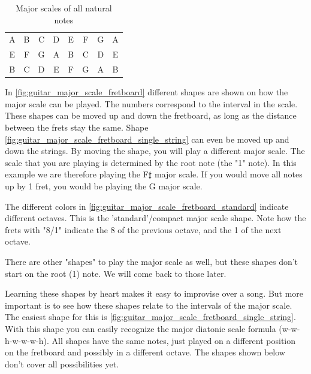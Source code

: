 \begin{table}[h]
\begin{tabular}{*{16}{c}}
		\multicolumn{2}{P{4mm}}{A} & \multicolumn{2}{P{4mm}}{B} & \multicolumn{2}{P{4mm}}{C\sharp} & \multicolumn{2}{P{4mm}}{D} & \multicolumn{2}{P{4mm}}{E} & \multicolumn{2}{P{4mm}}{F\sharp} & \multicolumn{2}{P{4mm}}{G\sharp} & \multicolumn{2}{P{4mm}}{A} \\
		\multicolumn{2}{P{4mm}}{E} & \multicolumn{2}{P{4mm}}{F\sharp} & \multicolumn{2}{P{4mm}}{G\sharp} & \multicolumn{2}{P{4mm}}{A} & \multicolumn{2}{P{4mm}}{B} & \multicolumn{2}{P{4mm}}{C\sharp} & \multicolumn{2}{P{4mm}}{D\sharp} & \multicolumn{2}{P{4mm}}{E} \\
		\multicolumn{2}{P{4mm}}{B} & \multicolumn{2}{P{4mm}}{C\sharp} & \multicolumn{2}{P{4mm}}{D\sharp} & \multicolumn{2}{P{4mm}}{E} & \multicolumn{2}{P{4mm}}{F\sharp} & \multicolumn{2}{P{4mm}}{G\sharp} & \multicolumn{2}{P{4mm}}{A\sharp} & \multicolumn{2}{P{4mm}}{B}
	\end{tabular}
	\caption{Major scales of all natural notes}
	\label{tab:guitar_natural_note_major_scale}
\end{table}

\newpage

In \autoref{fig:guitar_major_scale_fretboard} different shapes are shown on how the major scale can be played. The numbers correspond to the interval in the scale. These shapes can be moved up and down the fretboard, as long as the distance between the frets stay the same. Shape \autoref{fig:guitar_major_scale_fretboard_single_string} can even be moved up and down the strings. By moving the shape, you will play a different major scale. The scale that you are playing is determined by the root note (the "1" note). In this example we are therefore playing the F$\sharp$ major scale. If you would move all notes up by 1 fret, you would be playing the G major scale.

The different colors in \autoref{fig:guitar_major_scale_fretboard_standard} indicate different octaves. This is the 'standard'/compact major scale shape. Note how the frets with "8/1" indicate the 8 of the previous octave, and the 1 of the next octave.

There are other "shapes" to play the major scale as well, but these shapes don't start on the root (1) note. We will come back to those later.

Learning these shapes by heart makes it easy to improvise over a song. But more important is to see how these shapes relate to the intervals of the major scale. The easiest shape for this is \autoref{fig:guitar_major_scale_fretboard_single_string}. With this shape you can easily recognize the major diatonic scale formula (w-w-h-w-w-w-h). All shapes have the same notes, just played on a different position on the fretboard and possibly in a different octave. The shapes shown below don't cover all possibilities yet.

